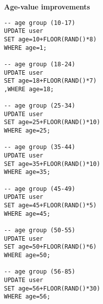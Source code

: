 \noindent\textbf{Age-value improvements} \\

\begin{lstlisting}
-- age group (10-17)
UPDATE user
SET age=10+FLOOR(RAND()*8)
WHERE age=1;

-- age group (18-24)
UPDATE user
SET age=18+FLOOR(RAND()*7)
,WHERE age=18;

-- age group (25-34)
UPDATE user
SET age=25+FLOOR(RAND()*10)
WHERE age=25;

-- age group (35-44)
UPDATE user
SET age=35+FLOOR(RAND()*10)
WHERE age=35;

-- age group (45-49)
UPDATE user
SET age=45+FLOOR(RAND()*5)
WHERE age=45;

-- age group (50-55)
UPDATE user
SET age=50+FLOOR(RAND()*6)
WHERE age=50;

-- age group (56-85)
UPDATE user
SET age=56+FLOOR(RAND()*30)
WHERE age=56;
\end{lstlisting}